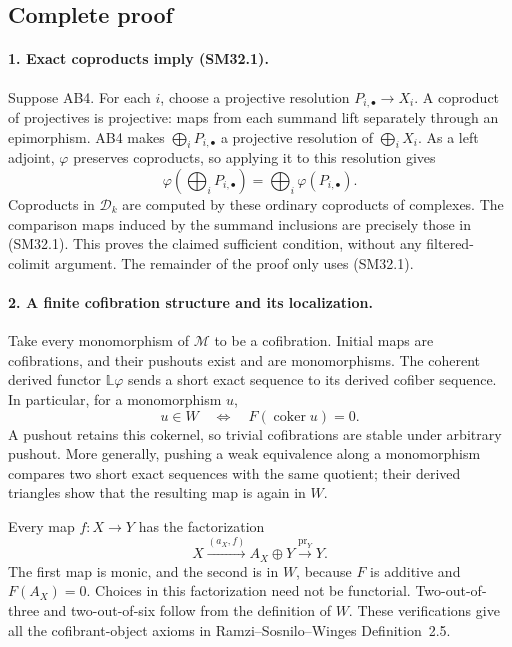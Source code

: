 \documentclass[11pt,a4paper]{article}
\theoremstyle{definition}\newtheorem{definition}[theorem]{Definition}
\theoremstyle{remark}\newtheorem{remark}[theorem]{Remark}
\begin{document}
\subsection{Complete proof}

\paragraph{1. Exact coproducts imply (SM32.1).}
Suppose AB4.  For each \(i\), choose a projective resolution
\(P_{i,\bullet}\to X_i\).  A coproduct of projectives is
projective: maps from each summand lift separately through an
epimorphism.  AB4 makes \(\bigoplus_iP_{i,\bullet}\) a
projective resolution of \(\bigoplus_iX_i\).
As a left adjoint, \(\varphi\) preserves coproducts, so applying
it to this resolution gives
\[
 \varphi\!\left(\bigoplus_iP_{i,\bullet}\right)
                  =\bigoplus_i\varphi(P_{i,\bullet}).
\]
Coproducts in \(\mathcal D_k\) are computed by these ordinary
coproducts of complexes.  The comparison maps induced by the
summand inclusions are precisely those in (SM32.1).  This proves
the claimed sufficient condition, without any filtered-colimit
argument.  The remainder of the proof only uses (SM32.1).

\paragraph{2. A finite cofibration structure and its localization.}
Take every monomorphism of \(\mathcal M\) to be a cofibration.
Initial maps are cofibrations, and their pushouts exist and are
monomorphisms.  The coherent derived functor
\(\mathbb L\varphi\) sends a short exact sequence to its
derived cofiber sequence.  In particular, for a monomorphism
\(u\),
\[
       u\in W\quad\Longleftrightarrow\quad
                       F(\operatorname{coker}u)=0.             \tag{SM32.3}
\]
A pushout retains this cokernel, so trivial cofibrations are
stable under arbitrary pushout.  More generally, pushing a
weak equivalence along a monomorphism compares two short
exact sequences with the same quotient; their derived
triangles show that the resulting map is again in \(W\).

Every map \(f:X\to Y\) has the factorization
\[
 X\xrightarrow{(a_X,f)}A_X\oplus Y
                          \xrightarrow{\operatorname{pr}_Y}Y. \tag{SM32.4}
\]
The first map is monic, and the second is in \(W\), because
\(F\) is additive and \(F(A_X)=0\).  Choices in this
factorization need not be functorial.  Two-out-of-three and
two-out-of-six follow from the definition of \(W\).
These verifications give all the cofibrant-object axioms in
Ramzi--Sosnilo--Winges Definition~2.5.
\end{document}
